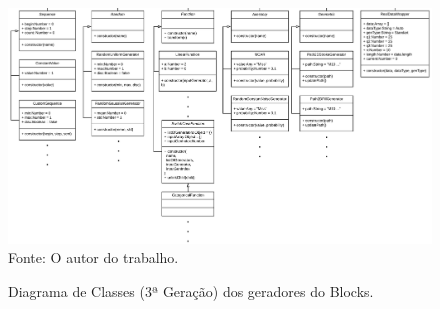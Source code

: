 \documentclass[
	12pt,				%
	openright,			%
	oneside,			%
	a4paper,			%
	english,			%
	brazil				%
	]{abntex2}
\begin{document}
	\begin{figure}[h!]
		\centering
		\caption{Diagrama de Classes (3ª Geração) dos geradores do Blocks.}
		\includegraphics[width=\linewidth]{./figures/prototipo/DiagramadeClasseGeradoresBaixo.png}
		\label{fig:diagramaCDBaixo}
		\footnotesize Fonte: O autor do trabalho.
	\end{figure}

	\pagebreak
\end{document}
